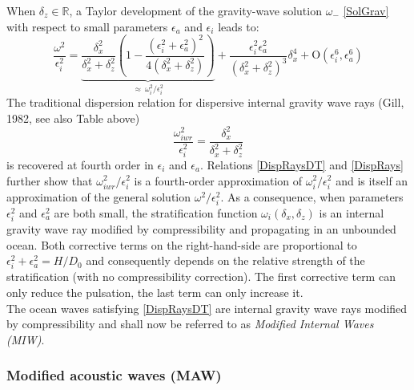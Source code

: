 \documentclass[a4paper,11pt]{article}
\begin{document}
When $\delta_z\in \mathbb{R}$, a Taylor development of the gravity-wave solution $\omega_{-}$ \ref{SolGrav} with respect to small parameters $\epsilon_a$ and $\epsilon_i$ leads to:
\begin{equation}
	\label{DispRaysDT}
		\frac{\omega^2}{\epsilon_i^2} =\underbrace{
		\frac{\delta_x^2}{\delta_x^2+\delta_z^2}
		\left(1-\frac{(\epsilon_i^2+\epsilon_a^2)^2}{4(\delta_x^2+\delta_z^2)}\right)}_{\approx\ \omega_i^2/\epsilon_i^2}
		+\frac{\epsilon_i^2\epsilon_a^2}{(\delta_x^2+\delta_z^2)^3}\delta_x^4
		+\mathrm{O}	(\epsilon_i^{6},\epsilon_a^{6})
\end{equation}
The traditional dispersion relation for dispersive internal gravity wave rays (Gill, 1982, see also Table  above)
\begin{equation}
	\frac{\omega_{iwr}^2}{\epsilon_i^2}=\frac{ \delta_x^2}{\delta_x^2+\delta_z^2}
	\label{DispRays}
\end{equation}
is recovered at fourth order in $\epsilon_i$ and $\epsilon_a$. Relations \ref{DispRaysDT} and \ref{DispRays} further show that $\omega_{iwr}^2/\epsilon_i^2$ is a fourth-order approximation of $\omega_i^2/\epsilon_i^2$ and is itself an approximation of the general solution $\omega^2/\epsilon_i^2$.
As a consequence, when parameters $\epsilon_i^2$ and $\epsilon_a^2$  are both small, the stratification function $\omega_i(\delta_x,\delta_z)$ is an internal gravity wave ray modified by compressibility and propagating in an unbounded ocean. Both corrective terms on the right-hand-side are proportional to $\epsilon_i^2+\epsilon_a^2=H/D_0$ and consequently depends on the relative strength of the stratification (with no compressibility correction). The first corrective term can only reduce the pulsation, the last term can only increase it. \\
The ocean waves satisfying \ref{DispRaysDT} are internal gravity wave rays modified by compressibility and shall now be referred to as \textit{Modified Internal Waves (MIW)}.

\subsubsection{Modified acoustic waves (MAW)}

\end{document}
